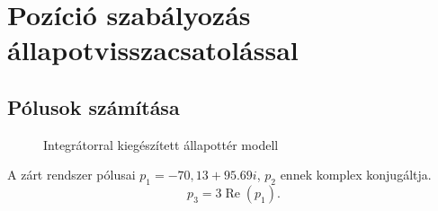 \section{Pozíció szabályozás állapotvisszacsatolással}

\subsection{Pólusok számítása}

\begin{figure}[H]
    \centering
	\caption{Integrátorral kiegészített állapottér modell}
	\label{fig:6a_allapotter_hatasvazlat_jav}
\end{figure}


A zárt rendszer pólusai $p_1 = -70,13 + 95.69i$, $p_2$ ennek komplex konjugáltja.
\begin{equation}
	p_3 = 3\operatorname{Re}(p_1).
\end{equation}


